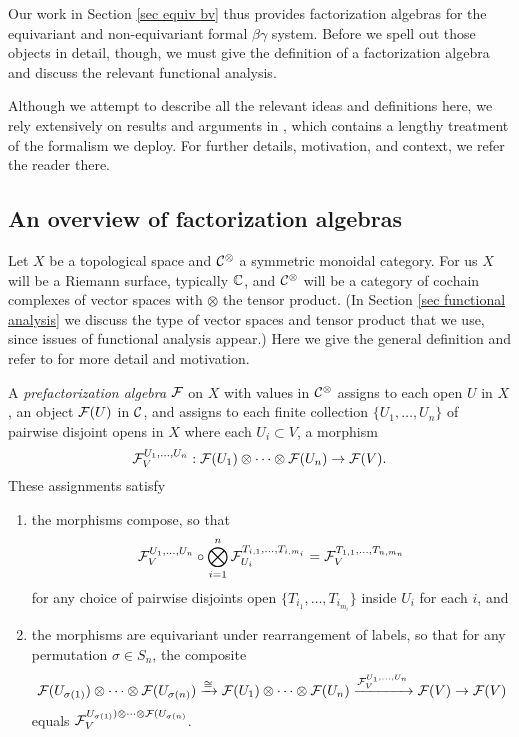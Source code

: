 Our work in Section \ref{sec equiv bv} thus provides factorization algebras 
for the equivariant and non-equivariant formal $\beta\gamma$ system.
Before we spell out those objects in detail, though, 
we must give the definition of a factorization algebra and discuss the relevant functional analysis.

\begin{rmk}
Although we attempt to describe all the relevant ideas and definitions here,
we rely extensively on results and arguments in \cite{CG2},
which contains a lengthy treatment of the formalism we deploy.
For further details, motivation, and context, we refer the reader there.
\end{rmk}

\subsection{An overview of factorization algebras}

Let $X$ be a topological space and $\mathcal C^\otimes$ a symmetric monoidal category.
For us $X$ will be a Riemann surface, typically $\mathbb C$, and 
$\mathcal C^\otimes$ will be a category of cochain complexes of vector spaces with $\otimes$ the tensor product.
(In Section \ref{sec functional analysis} we discuss the type of vector spaces and tensor product that we use,
since issues of functional analysis appear.)
Here we give the general definition and refer to \cite{CG1,CG2} for more detail and motivation.

\begin{dfn}
A \emph{prefactorization algebra} $\mathcal F$ on $X$ with values in $\mathcal C^\otimes$ 
assigns to each open $U$ in $X$, an object $\mathcal F(U)$ in $\mathcal C$, and 
assigns to each finite collection $\{U_1,\ldots,U_n\}$ of pairwise disjoint opens in $X$
where each $U_i \subset V$, a morphism
\[
\mathcal F_V^{U_1,\ldots,U_n}: \mathcal F(U_1) \otimes \cdots \otimes \mathcal F(U_n) \to \mathcal F(V).
\]
These assignments satisfy
\begin{enumerate}
\item the morphisms compose, so that
\[
\mathcal F_V^{U_1,\ldots,U_n} \circ \bigotimes_{i = 1}^n \mathcal F_{U_i}^{T_{i,1},\ldots,T_{i,{m_i}}} = \mathcal F_V^{T_{1,1},\ldots,T_{n,m_n}}
\]
for any choice of pairwise disjoints open $\{T_{i_1},\ldots,T_{i_{m_i}}\}$ inside $U_i$ for each $i$, and
\item the morphisms are equivariant under rearrangement of labels, 
so that for any permutation $\sigma \in S_n$, the composite
\[
\mathcal F(U_{\sigma(1)}) \otimes \cdots \otimes \mathcal F(U_{\sigma(n)}) \xrightarrow{\cong} \mathcal F(U_1) \otimes \cdots \otimes \mathcal F(U_n) \xrightarrow{\mathcal F_V^{U_1,\ldots,U_n}} \mathcal F(V)\to \mathcal F(V)
\] 
equals $\mathcal F_V^{U_{\sigma(1)}) \otimes \cdots \otimes \mathcal F(U_{\sigma(n)}}$.
\end{enumerate}
\end{dfn}

